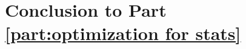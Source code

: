 \chapter{Conclusion to Part \ref{part:optimization for stats}}
\label{Ch:StatisticalOptimizationConclusion}


\graphicspath{{Figures/Mixtures/}}

